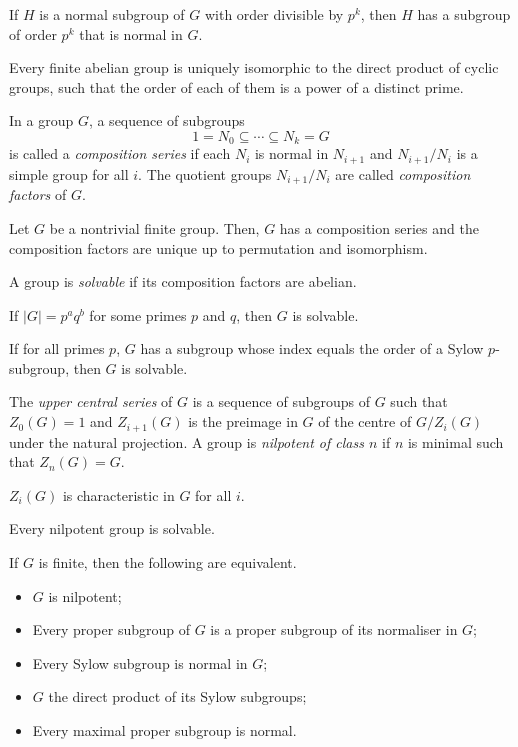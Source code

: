 \begin{cor}
    If $H$ is a normal subgroup of $G$ with order divisible by $p^k$, then $H$
    has a subgroup of order $p^k$ that is normal in $G$.
\end{cor}
\begin{thm}
    Every finite abelian group is uniquely isomorphic to the direct
    product of cyclic groups, such that the order of each of them is a power of
    a distinct prime.
\end{thm}
\begin{defn}
    In a group $G$, a sequence of subgroups
    \[1=N_0\subseteq\cdots\subseteq N_k=G\]
    is called a \emph{composition series} if each $N_i$ is normal in $N_{i+1}$
    and $N_{i+1}/N_i$ is a simple group for all $i$. The quotient groups
    $N_{i+1}/N_i$ are called \emph{composition factors} of $G$.
\end{defn}
\begin{thm}
    Let $G$ be a nontrivial finite group. Then, $G$ has a composition series and
    the composition factors are unique up to permutation and isomorphism.
\end{thm}
\begin{defn}
    A group is \emph{solvable} if its composition factors are abelian.
\end{defn}
\begin{thm}[Burnside]
    If $|G|=p^a q^b$ for some primes $p$ and $q$, then $G$ is solvable.
\end{thm}
\begin{thm}[Hall]
    If for all primes $p$, $G$ has a subgroup whose index equals the order of a
    Sylow $p$-subgroup, then $G$ is solvable.
\end{thm}
\begin{defn}
    The \emph{upper central series} of $G$ is a sequence of subgroups of $G$ such that
    $Z_0(G)=1$ and $Z_{i+1}(G)$ is the preimage in $G$ of the centre of
    $G/Z_i(G)$ under the natural projection. A group is \emph{nilpotent of class
    $n$} if $n$ is minimal such that $Z_n(G)=G$.
\end{defn}
\begin{prop}
    $Z_i(G)$ is characteristic in $G$ for all $i$.
\end{prop}
\begin{prop}
    Every nilpotent group is solvable.
\end{prop}
\begin{thm}
    If $G$ is finite, then the following are equivalent.
    \begin{itemize}
        \item $G$ is nilpotent;
        \item Every proper subgroup of $G$ is a proper subgroup of its
            normaliser in $G$;
        \item Every Sylow subgroup is normal in $G$;
        \item $G$ the direct product of its Sylow subgroups;
        \item Every maximal proper subgroup is normal.
    \end{itemize}
\end{thm}
